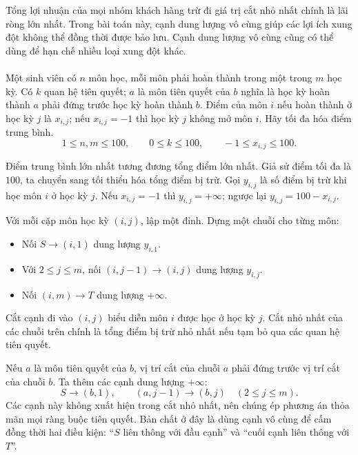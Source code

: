 \documentclass[11pt]{article}
\begin{document}
Tổng lợi nhuận của mọi nhóm khách hàng trừ đi giá trị cắt nhỏ nhất chính là
lãi ròng lớn nhất. Trong bài toán này, cạnh dung lượng vô cùng giúp các lợi
ích xung đột không thể đồng thời được bảo lưu. Cạnh dung lượng vô cùng cũng
có thể dùng để hạn chế nhiều loại xung đột khác.

\paragraph{}
Một sinh viên có \(n\) môn học, mỗi môn phải hoàn thành trong một trong
\(m\) học kỳ. Có \(k\) quan hệ tiên quyết; \(a\) là môn tiên quyết của \(b\)
nghĩa là học kỳ hoàn thành \(a\) phải đứng trước học kỳ hoàn thành \(b\).
Điểm của môn \(i\) nếu hoàn thành ở học kỳ \(j\) là \(x_{i,j}\); nếu
\(x_{i,j}=-1\) thì học kỳ \(j\) không mở môn \(i\). Hãy tối đa hóa điểm trung
bình.
\[
  1\le n,m\le 100,\qquad 0\le k\le 100,\qquad -1\le x_{i,j}\le 100.
\]

Điểm trung bình lớn nhất tương đương tổng điểm lớn nhất. Giả sử điểm tối đa
là \(100\), ta chuyển sang tối thiểu hóa tổng điểm bị trừ. Gọi \(y_{i,j}\) là
số điểm bị trừ khi học môn \(i\) ở học kỳ \(j\). Nếu \(x_{i,j}=-1\) thì
\(y_{i,j}=+\infty\); ngược lại \(y_{i,j}=100-x_{i,j}\).

Với mỗi cặp môn học kỳ \((i,j)\), lập một đỉnh. Dựng một chuỗi cho từng môn:
\begin{itemize}
  \item Nối \(S\to (i,1)\) dung lượng \(y_{i,1}\).
  \item Với \(2\le j\le m\), nối \((i,j-1)\to (i,j)\) dung lượng \(y_{i,j}\).
  \item Nối \((i,m)\to T\) dung lượng \(+\infty\).
\end{itemize}

Cắt cạnh đi vào \((i,j)\) biểu diễn môn \(i\) được học ở học kỳ \(j\). Cắt
nhỏ nhất của các chuỗi trên chính là tổng điểm bị trừ nhỏ nhất nếu tạm bỏ qua
các quan hệ tiên quyết.

Nếu \(a\) là môn tiên quyết của \(b\), vị trí cắt của chuỗi \(a\) phải đứng
trước vị trí cắt của chuỗi \(b\). Ta thêm các cạnh dung lượng \(+\infty\):
\[
  S\to (b,1),\qquad (a,j-1)\to (b,j)\quad (2\le j\le m).
\]
Các cạnh này không xuất hiện trong cắt nhỏ nhất, nên chúng ép phương án thỏa
mãn mọi ràng buộc tiên quyết. Bản chất ở đây là dùng cạnh vô cùng để cấm đồng
thời hai điều kiện: ``\(S\) liên thông với đầu cạnh'' và ``cuối cạnh liên
thông với \(T\)''.
\end{document}

